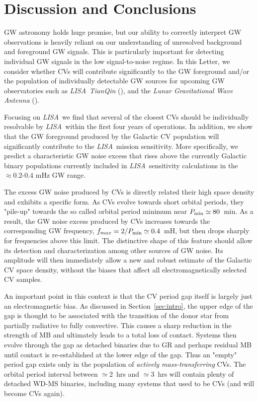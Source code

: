 \documentclass[fleqn,usenatbib]{mnras}
\newcommand{\lisa}{{\it LISA}}
\begin{document}
\section{Discussion and Conclusions} \label{sec:discussion}

GW astronomy holds huge promise, but our ability to correctly interpret GW observations is heavily reliant on our understanding of unresolved background and foreground GW signals. This is particularly important for detecting individual GW signals in the low signal-to-noise regime. In this Letter, we consider whether CVs will contribute significantly to the GW foreground and/or the population of individually detectable GW sources for upcoming GW observatories such as \lisa\,  \textit{TianQin} (\citealt{luo16}), and the \textit{Lunar Gravitational Wave Antenna} (\citealt{harms21}).  

Focusing on \lisa\, we find that several of the closest CVs should be individually resolvable by \lisa\ within the first four years of operations. In addition, we show that the GW foreground produced by the Galactic CV population will significantly contribute to the \lisa\ mission sensitivity. More specifically, we predict a characteristic GW noise excess that rises above the currently Galactic binary populations currently included in \lisa\ sensitivity calculations in the $\approx 0.2$-$0.4$ mHz GW range. 

The excess GW noise produced by CVs is directly related their high space density and exhibits a specific form. As CVs evolve towards short orbital periods, they "pile-up" towards the so called orbital period minimum near $P_{\rm{min}} \simeq 80$~min. As a result, the GW noise excess produced by CVs increases towards the corresponding GW frequency, $f_{max} = 2/P_{\rm{min}} \simeq 0.4$~mH, but then drops sharply for frequencies above this limit. The distinctive shape of this feature should allow its detection and characterization among other sources of GW noise. Its amplitude will then immediately allow a new and robust estimate of the Galactic CV space density, without the biases that affect all electromagnetically selected CV samples.

An important point in this context is that the CV period gap itself is largely just an electromagnetic bias. As discussed in Section~\ref{sec:intro}, the upper edge of the gap is thought to be associated with the transition of the donor star from partially radiative to fully convective. This causes a sharp reduction in the strength of MB and ultimately leads to a total loss of contact. Systems then evolve through the gap as detached binaries due to GR and perhaps residual MB until contact is re-established at the lower edge of the gap. Thus an "empty" period gap exists only in the population of {\em actively mass-transferring} CVs. The orbital period interval between $\simeq$2~hrs and $\simeq$3~hrs will contain plenty of detached WD-MS binaries, including many systems that used to be CVs (and will become CVs again). 
\end{document}
